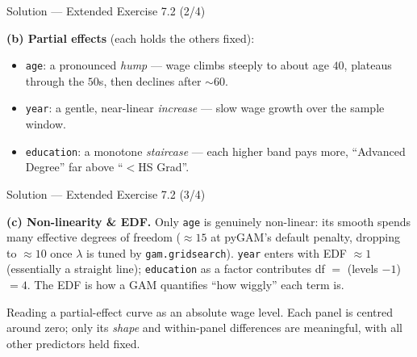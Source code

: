 \documentclass[aspectratio=169,11pt]{beamer}
\begin{document}
\begin{frame}{Solution --- Extended Exercise 7.2 (2/4)}
\begin{solutionbox}
\textbf{(b) Partial effects} (each holds the others fixed):
\begin{itemize}
  \item \texttt{age}: a pronounced \emph{hump} --- wage climbs steeply to about age $40$, plateaus through the $50$s, then declines after $\sim$60.
  \item \texttt{year}: a gentle, near-linear \emph{increase} --- slow wage growth over the sample window.
  \item \texttt{education}: a monotone \emph{staircase} --- each higher band pays more, ``Advanced Degree'' far above ``$<$HS Grad''.
\end{itemize}
\end{solutionbox}
\end{frame}

\begin{frame}{Solution --- Extended Exercise 7.2 (3/4)}
\begin{solutionbox}
\textbf{(c) Non-linearity \& EDF.} Only \texttt{age} is genuinely non-linear: its smooth spends many effective degrees of freedom ($\approx15$ at pyGAM's default penalty, dropping to $\approx10$ once $\lambda$ is tuned by \texttt{gam.gridsearch}). \texttt{year} enters with EDF $\approx1$ (essentially a straight line); \texttt{education} as a factor contributes df $=$ (levels $-1$) $=4$. The EDF is how a GAM quantifies ``how wiggly'' each term is.
\end{solutionbox}
\begin{mistake}
Reading a partial-effect curve as an absolute wage level. Each panel is centred around zero; only its \emph{shape} and within-panel differences are meaningful, with all other predictors held fixed.
\end{mistake}
\end{frame}
\end{document}
